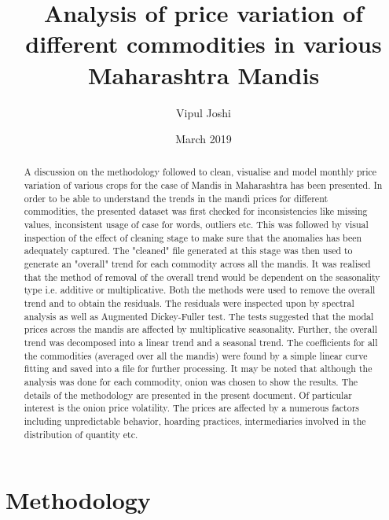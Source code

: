 \documentclass{article}
\title{Analysis of price variation of different commodities in various Maharashtra Mandis}
\author{Vipul Joshi }
\date{March 2019}
\begin{document}
   


\maketitle
 \begin{abstract}
        A discussion on the methodology followed to clean, visualise and model monthly price variation of various crops for the case of Mandis in Maharashtra has been presented. In order to be able to understand the trends in the mandi prices for different commodities, the presented dataset was first checked for inconsistencies like missing values, inconsistent usage of case for words, outliers etc. This was followed by visual inspection of the effect of cleaning stage to make sure that the anomalies has been adequately captured. The "cleaned" file generated at this stage was then used to generate an "overall" trend for each commodity across all the mandis. It was realised that the method of removal of the overall trend would be dependent on the seasonality type i.e. additive or multiplicative. Both the methods were used to remove the overall trend and to obtain the residuals. The residuals were inspected upon by spectral analysis as well as Augmented Dickey-Fuller test. The tests suggested that the modal prices across the mandis are affected by multiplicative seasonality. Further, the overall trend was decomposed into a linear trend and a seasonal trend. The coefficients for all the commodities (averaged over all the mandis) were found by a simple linear curve fitting and saved into a file for further processing. It may be noted that although the analysis was done for each commodity, onion was chosen to show the results. The details of the methodology are presented in the present document. Of particular interest is the onion price volatility. The prices are affected by a numerous factors including unpredictable behavior, hoarding practices, intermediaries involved in the distribution of quantity etc. 
    \end{abstract}
\section{Methodology}
\end{document}

